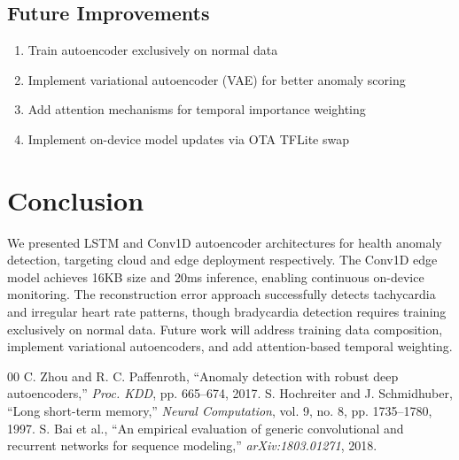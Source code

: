 \documentclass[conference]{IEEEtran}
\begin{document}
\subsection{Future Improvements}
\begin{enumerate}
    \item Train autoencoder exclusively on normal data
    \item Implement variational autoencoder (VAE) for better anomaly scoring
    \item Add attention mechanisms for temporal importance weighting
    \item Implement on-device model updates via OTA TFLite swap
\end{enumerate}

\section{Conclusion}
We presented LSTM and Conv1D autoencoder architectures for health anomaly detection, targeting cloud and edge deployment respectively. The Conv1D edge model achieves 16KB size and 20ms inference, enabling continuous on-device monitoring. The reconstruction error approach successfully detects tachycardia and irregular heart rate patterns, though bradycardia detection requires training exclusively on normal data. Future work will address training data composition, implement variational autoencoders, and add attention-based temporal weighting.

\begin{thebibliography}{00}
 C. Zhou and R. C. Paffenroth, ``Anomaly detection with robust deep autoencoders,'' \textit{Proc. KDD}, pp. 665--674, 2017.
 S. Hochreiter and J. Schmidhuber, ``Long short-term memory,'' \textit{Neural Computation}, vol. 9, no. 8, pp. 1735--1780, 1997.
 S. Bai et al., ``An empirical evaluation of generic convolutional and recurrent networks for sequence modeling,'' \textit{arXiv:1803.01271}, 2018.
\end{thebibliography}
\end{document}
